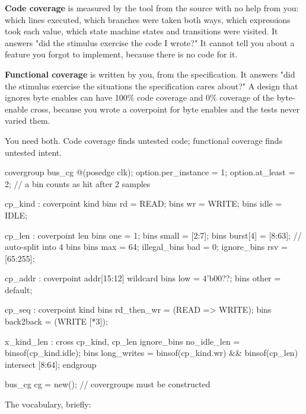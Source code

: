 \textbf{Code coverage} is measured by the tool from the \RTL{} source with no
help from you: which lines executed, which branches were taken both ways,
which expressions took each value, which state machine states and transitions
were visited. It answers "did the stimulus exercise the code I wrote?" It
cannot tell you about a feature you forgot to implement, because there is no
code for it.

\textbf{Functional coverage} is written by you, from the specification. It
answers "did the stimulus exercise the situations the specification cares
about?" A design that ignores byte enables can have 100\% code coverage and
0\% coverage of the byte-enable cross, because you wrote a coverpoint for
byte enables and the tests never varied them.

You need both. Code coverage finds untested code; functional coverage finds
untested intent.

\begin{svcode}[caption={A covergroup for the bus transaction},label={lst:beyond:cg}]
covergroup bus_cg @(posedge clk);
  option.per_instance = 1;
  option.at_least     = 2;      // a bin counts as hit after 2 samples

  cp_kind : coverpoint kind {
    bins rd   = {READ};
    bins wr   = {WRITE};
    bins idle = {IDLE};
  }

  cp_len : coverpoint len {
    bins one       = {1};
    bins small     = {[2:7]};
    bins burst[4]  = {[8:63]};       // auto-split into 4 bins
    bins max       = {64};
    illegal_bins bad = {0};
    ignore_bins  rsv = {[65:255]};
  }

  cp_addr : coverpoint addr[15:12] {
    wildcard bins low  = {4'b00??};
    bins     other     = default;
  }

  cp_seq : coverpoint kind {
    bins rd_then_wr = (READ => WRITE);
    bins back2back  = (WRITE [*3]);
  }

  x_kind_len : cross cp_kind, cp_len {
    ignore_bins no_idle_len = binsof(cp_kind.idle);
    bins        long_writes = binsof(cp_kind.wr) &&
                              binsof(cp_len) intersect {[8:64]};
  }
endgroup

bus_cg cg = new();      // covergroups must be constructed
\end{svcode}

The vocabulary, briefly:

